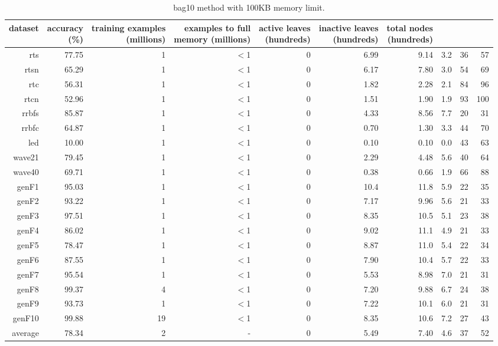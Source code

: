 \begin{table}
\caption{{\sc bag10} method with 100KB memory limit.}
\label{tab:bag10-100k}
\centering
\begin{tabular}{|r|r|r|r|r|r|r|r|r|r|}
\hline
dataset	&
\rotatebox{90}{\parbox{9em}{accuracy\\(\%)}} &
\rotatebox{90}{\parbox{9em}{training examples\\(millions)}} &
\rotatebox{90}{\parbox{9em}{examples to full\\memory (millions)}} &
\rotatebox{90}{\parbox{9em}{active leaves\\(hundreds)}} &
\rotatebox{90}{\parbox{9em}{inactive leaves\\(hundreds)}} &
\rotatebox{90}{\parbox{9em}{total nodes\\(hundreds)}} &
\rotatebox{90}{\parbox{9em}{average tree depth}}	&
\rotatebox{90}{\parbox{9em}{training speed (\%)}} &
\rotatebox{90}{\parbox{9em}{prediction speed (\%)}} \\
\hline
{\sc rts} & 77.75 & 1 & $<$1 & 0 & 6.99 & 9.14 & 3.2 & 36 & 57 \\
{\sc rtsn} & 65.29 & 1 & $<$1 & 0 & 6.17 & 7.80 & 3.0 & 54 & 69 \\
{\sc rtc} & 56.31 & 1 & $<$1 & 0 & 1.82 & 2.28 & 2.1 & 84 & 96 \\
{\sc rtcn} & 52.96 & 1 & $<$1 & 0 & 1.51 & 1.90 & 1.9 & 93 & 100 \\
{\sc rrbfs} & 85.87 & 1 & $<$1 & 0 & 4.33 & 8.56 & 7.7 & 20 & 31 \\
{\sc rrbfc} & 64.87 & 1 & $<$1 & 0 & 0.70 & 1.30 & 3.3 & 44 & 70 \\
{\sc led} & 10.00 & 1 & $<$1 & 0 & 0.10 & 0.10 & 0.0 & 43 & 63 \\
{\sc wave21} & 79.45 & 1 & $<$1 & 0 & 2.29 & 4.48 & 5.6 & 40 & 64 \\
{\sc wave40} & 69.71 & 1 & $<$1 & 0 & 0.38 & 0.66 & 1.9 & 66 & 88 \\
{\sc genF1} & 95.03 & 1 & $<$1 & 0 & 10.4 & 11.8 & 5.9 & 22 & 35 \\
{\sc genF2} & 93.22 & 1 & $<$1 & 0 & 7.17 & 9.96 & 5.6 & 21 & 33 \\
{\sc genF3} & 97.51 & 1 & $<$1 & 0 & 8.35 & 10.5 & 5.1 & 23 & 38 \\
{\sc genF4} & 86.02 & 1 & $<$1 & 0 & 9.02 & 11.1 & 4.9 & 21 & 33 \\
{\sc genF5} & 78.47 & 1 & $<$1 & 0 & 8.87 & 11.0 & 5.4 & 22 & 34 \\
{\sc genF6} & 87.55 & 1 & $<$1 & 0 & 7.90 & 10.4 & 5.7 & 22 & 33 \\
{\sc genF7} & 95.54 & 1 & $<$1 & 0 & 5.53 & 8.98 & 7.0 & 21 & 31 \\
{\sc genF8} & 99.37 & 4 & $<$1 & 0 & 7.20 & 9.88 & 6.7 & 24 & 38 \\
{\sc genF9} & 93.73 & 1 & $<$1 & 0 & 7.22 & 10.1 & 6.0 & 21 & 31 \\
{\sc genF10} & 99.88 & 19 & $<$1 & 0 & 8.35 & 10.6 & 7.2 & 27 & 43 \\
\hline
average & 78.34 & 2 &  -  & 0 & 5.49 & 7.40 & 4.6 & 37 & 52 \\
\hline
\end{tabular}
\end{table}
